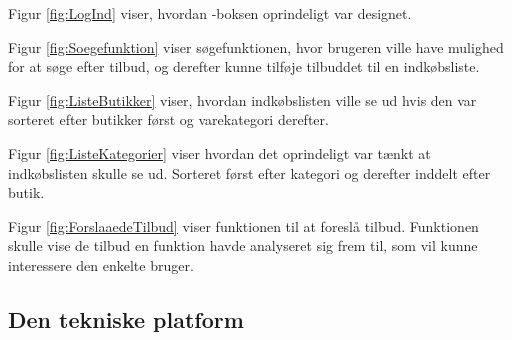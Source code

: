 Figur \ref{fig:LogInd} viser, hvordan -boksen oprindeligt var designet.

Figur \ref{fig:Soegefunktion} viser søgefunktionen, hvor brugeren ville have mulighed for at søge efter tilbud, og derefter kunne tilføje tilbuddet til en indkøbsliste.

Figur \ref{fig:ListeButikker} viser, hvordan indkøbslisten ville se ud hvis den var sorteret efter butikker først og varekategori derefter.

Figur \ref{fig:ListeKategorier} viser hvordan det oprindeligt var tænkt at indkøbslisten skulle se ud. Sorteret først efter kategori og derefter inddelt efter butik.

Figur \ref{fig:ForslaaedeTilbud} viser funktionen til at foreslå tilbud. Funktionen skulle vise de tilbud en funktion havde analyseret sig frem til, som vil kunne interessere den enkelte bruger.

\subsection{Den tekniske platform}
 